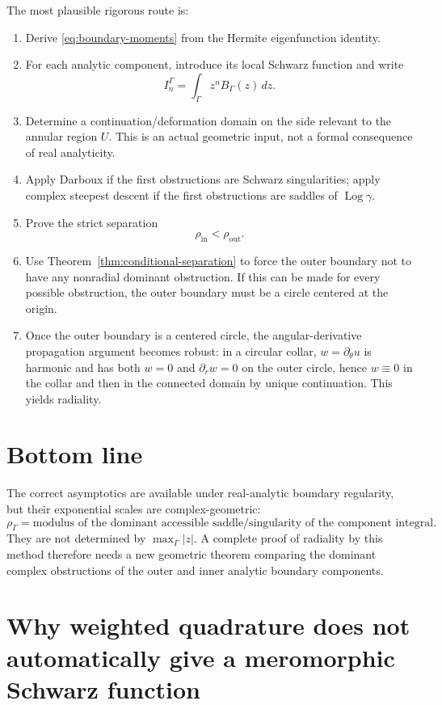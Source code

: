 \documentclass[11pt]{article}
\newcommand{\dd}{\,d}
\newcommand{\1}{\mathbf 1}
\newcommand{\Log}{\operatorname{Log}}
\begin{document}
The most plausible rigorous route is:
\begin{enumerate}[label=\arabic*.]
\item Derive \eqref{eq:boundary-moments} from the Hermite eigenfunction identity.
\item For each analytic component, introduce its local Schwarz function and write
\[
  I_n^\Gamma=\int_\Gamma z^nB_\Gamma(z)\dd z.
\]
\item Determine a continuation/deformation domain on the side relevant to the annular
region \(U\). This is an actual geometric input, not a formal consequence of real
analyticity.
\item Apply Darboux if the first obstructions are Schwarz singularities; apply complex
steepest descent if the first obstructions are saddles of \(\Log\gamma\).
\item Prove the strict separation
\[
  \rho_{\mathrm{in}}<\rho_{\mathrm{out}}.
\]
\item Use Theorem~\ref{thm:conditional-separation} to force the outer boundary not to have
any nonradial dominant obstruction. If this can be made for every possible obstruction,
the outer boundary must be a circle centered at the origin.
\item Once the outer boundary is a centered circle, the angular-derivative propagation
argument becomes robust: in a circular collar, \(w=\partial_\theta u\) is harmonic and has
both \(w=0\) and \(\partial_r w=0\) on the outer circle, hence \(w\equiv0\) in the collar
and then in the connected domain by unique continuation. This yields radiality.
\end{enumerate}

\section{Bottom line}

The correct asymptotics are available under real-analytic boundary regularity, but their
exponential scales are complex-geometric:
\[
  \rho_\Gamma
  =
  \text{modulus of the dominant accessible saddle/singularity of the component integral}.
\]
They are not determined by \(\max_\Gamma |z|\). A complete proof of radiality by this
method therefore needs a new geometric theorem comparing the dominant complex
obstructions of the outer and inner analytic boundary components.

\section{Why weighted quadrature does not automatically give a meromorphic Schwarz function}
\end{document}
